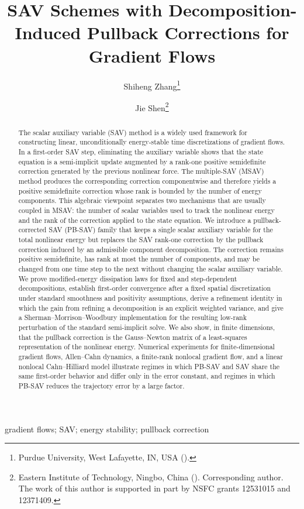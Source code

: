 \documentclass[10pt,onefignum,onetabnum,hidelinks]{siamart251216}
\title{SAV Schemes with Decomposition-Induced Pullback Corrections for Gradient Flows}
\author{Shiheng Zhang\thanks{Purdue University, West Lafayette, IN, USA (\email{shzhang3722@gmail.com}).}
\and Jie Shen\thanks{Eastern Institute of Technology, Ningbo, China
(\email{jshen@eitech.edu.cn}). Corresponding author. The work of this author is supported in part by NSFC grants 12531015 and 12371409.}}
\begin{document}
\maketitle

\begin{abstract}
The scalar auxiliary variable (SAV) method is a widely used framework for constructing linear, unconditionally energy-stable time discretizations of gradient flows.  In a first-order SAV step, eliminating the auxiliary variable shows that the state equation is a semi-implicit update augmented by a rank-one positive semidefinite correction generated by the previous nonlinear force.  The multiple-SAV (MSAV) method produces the corresponding correction componentwise and therefore yields a positive semidefinite correction whose rank is bounded by the number of energy components.  This algebraic viewpoint separates two mechanisms that are usually coupled in MSAV: the number of scalar variables used to track the nonlinear energy and the rank of the correction applied to the state equation.  We introduce a pullback-corrected SAV (PB-SAV) family that keeps a single scalar auxiliary variable for the total nonlinear energy but replaces the SAV rank-one correction by the pullback correction induced by an admissible component decomposition.  The correction remains positive semidefinite, has rank at most the number of components, and may be changed from one time step to the next without changing the scalar auxiliary variable.  We prove modified-energy dissipation laws for fixed and step-dependent decompositions, establish first-order convergence after a fixed spatial discretization under standard smoothness and positivity assumptions, derive a refinement identity in which the gain from refining a decomposition is an explicit weighted variance, and give a Sherman--Morrison--Woodbury implementation for the resulting low-rank perturbation of the standard semi-implicit solve.  We also show, in finite dimensions, that the pullback correction is the Gauss--Newton matrix of a least-squares representation of the nonlinear energy.  Numerical experiments for finite-dimensional gradient flows, Allen--Cahn dynamics, a finite-rank nonlocal gradient flow, and a linear nonlocal Cahn--Hilliard model illustrate regimes in which PB-SAV and SAV share the same first-order behavior and differ only in the error constant, and regimes in which PB-SAV reduces the trajectory error by a large factor.
\end{abstract}

\begin{keywords}
gradient flows; SAV;  energy stability; pullback correction
\end{keywords}
\end{document}
